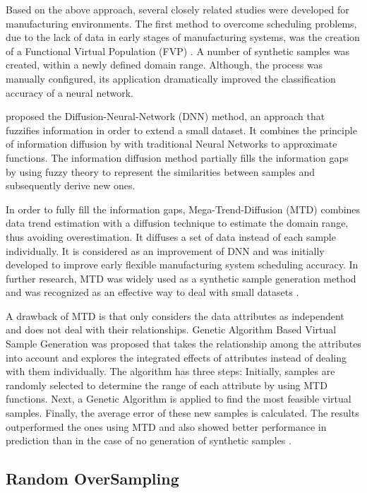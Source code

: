 \documentclass[parskip=full]{scrartcl}
\begin{document}
Based on the above approach, several closely related studies were developed for manufacturing environments. The first method to overcome scheduling problems, due to the lack of data in early stages of manufacturing systems, was the creation of a Functional Virtual Population (FVP) \cite{Li.2003}. A number of synthetic samples was created, within a newly defined domain range. Although, the process was manually configured, its application dramatically improved the classification accuracy of a neural network. 

\cite{Huang.2004} proposed the Diffusion-Neural-Network (DNN) method, an approach that fuzzifies information in order to extend a small dataset. It combines the principle of information diffusion by \cite{Huang.1997} with traditional Neural Networks to approximate functions. The information diffusion method partially fills the information gaps by using fuzzy theory to represent the similarities between samples and subsequently derive new ones.

In order to fully fill the information gaps, Mega-Trend-Diffusion (MTD) \cite{Li.2007} combines data trend estimation with a diffusion technique to estimate the domain range, thus avoiding overestimation. It diffuses a set of data instead of each sample individually. It is considered as an improvement of DNN and was initially developed to improve early flexible manufacturing system scheduling accuracy. In further research, MTD was widely used as a synthetic sample generation method and was recognized as an effective way to deal with small datasets \cite{AbdulLateh.2017}.

A drawback of MTD is that only considers the data attributes as independent and does not deal with their relationships. Genetic Algorithm Based Virtual Sample Generation was proposed that takes the relationship among the attributes into account and explores the integrated effects of attributes instead of dealing with them individually. The algorithm has three steps: Initially, samples are randomly selected to determine the range of each attribute by using MTD functions. Next, a Genetic Algorithm is applied to find the most feasible virtual samples. Finally, the average error of these new samples is calculated. The results outperformed the ones using MTD and also showed better performance in prediction than in the case of no generation of synthetic samples \cite{Li.2014, Lin.2010}.

\subsection{Random OverSampling}
\end{document}
